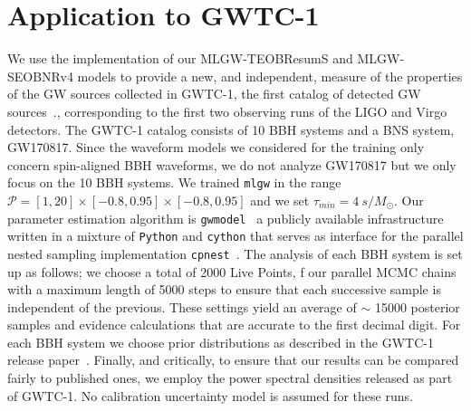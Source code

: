 \section{Application to GWTC-1}
\label{sec:GWTC1}
We use the implementation of our MLGW-TEOBResumS and MLGW-SEOBNRv4 models 
to provide a new, and independent, measure of the properties of the GW sources
collected in GWTC-1, the first catalog of detected GW sources~\cite{LIGOScientific:2018mvr}.,
corresponding to the first two observing runs of the LIGO and Virgo detectors.
The GWTC-1 catalog consists of 10 BBH systems and a BNS system, GW170817. 
Since the waveform models we considered for the training only concern spin-aligned
BBH waveforms, we do not analyze GW170817 but we only focus on the 10 BBH systems.
We trained \texttt{mlgw} in the range $\mathcal{P} = [1,20]\times[-0.8,0.95]\times[-0.8,0.95]$ 
and we set $\tau_{min} = \SI{4}{s/M_\odot}$.
Our parameter estimation algorithm is \texttt{gwmodel}~\cite{} a publicly available infrastructure 
written in a mixture of \texttt{Python} and \texttt{cython} that serves as interface for the parallel nested 
sampling implementation \texttt{cpnest}~\cite{}. 
The analysis of each BBH system is set up as follows; we choose a total of 2000 Live Points, f
our parallel MCMC chains with a maximum length of 5000 steps to ensure that each successive 
sample is independent of the previous. These settings yield an average of $\sim$ 15000 posterior samples and 
evidence calculations that are accurate to the first decimal digit. For each BBH system we choose 
prior distributions as described in the GWTC-1 release paper~\cite{LIGOScientific:2018mvr}. Finally, 
and critically, to ensure that our results can be compared fairly to published ones, 
we employ the power spectral densities released as part of GWTC-1. No calibration uncertainty model is assumed for these runs. 

